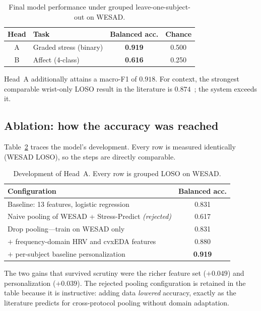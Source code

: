 \documentclass[11pt,a4paper]{article}
\newcommand{\kpi}[1]{\textbf{#1}}
\begin{document}
\begin{table}[t]
\centering
\caption{Final model performance under grouped leave-one-subject-out on WESAD.}
\label{tab:acc}
\footnotesize
\renewcommand{\arraystretch}{1.2}
\begin{tabular}{c p{5.2cm} c c}
\toprule
\textbf{Head} & \textbf{Task} & \textbf{Balanced acc.} & \textbf{Chance} \\
\midrule
\rowcolor{rowalt}
A & Graded stress (binary) & \kpi{0.919} & 0.500 \\
B & Affect (4-class) & \kpi{0.616} & 0.250 \\
\bottomrule
\end{tabular}
\end{table}

Head~A additionally attains a macro-F1 of $0.918$. For context, the strongest comparable wrist-only
LOSO result in the literature is $0.874$~\cite{siirtola2019}; the system exceeds it.

\subsection{Ablation: how the accuracy was reached}
Table~\ref{tab:ablation} traces the model's development. Every row is measured identically (WESAD
LOSO), so the steps are directly comparable.

\begin{table}[t]
\centering
\caption{Development of Head~A. Every row is grouped LOSO on WESAD.}
\label{tab:ablation}
\footnotesize
\renewcommand{\arraystretch}{1.2}
\begin{tabular}{p{9.5cm} c}
\toprule
\textbf{Configuration} & \textbf{Balanced acc.} \\
\midrule
\rowcolor{rowalt}
Baseline: 13 features, logistic regression & 0.831 \\
Naive pooling of WESAD + Stress-Predict \emph{(rejected)} & 0.617 \\
\rowcolor{rowalt}
Drop pooling---train on WESAD only & 0.831 \\
$+$ frequency-domain HRV and cvxEDA features & 0.880 \\
\rowcolor{rowalt}
$+$ per-subject baseline personalization & \kpi{0.919} \\
\bottomrule
\end{tabular}
\end{table}

The two gains that survived scrutiny were the richer feature set ($+0.049$) and personalization
($+0.039$). The rejected pooling configuration is retained in the table because it is instructive:
adding data \emph{lowered} accuracy, exactly as the literature predicts for cross-protocol pooling
without domain adaptation.
\end{document}
